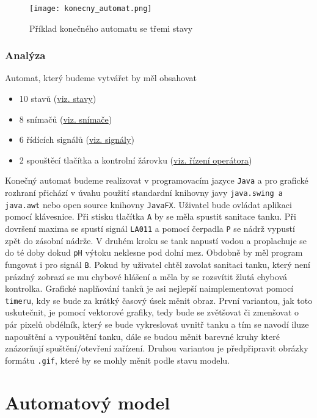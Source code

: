 \documentclass[12pt, a4paper]{article}
\begin{document}
\begin{figure}[h!]
    \centering
    \texttt{[image: konecny\_automat.png]}
    \caption{Příklad konečného automatu se třemi stavy}
    \label{konecny_automat: 1}
\end{figure}

\subsubsection{Analýza}

Automat, který budeme vytvářet by měl obsahovat
\begin{itemize}
    \item 10 stavů (\hyperref[sec: stavy]{viz. stavy})
    \item 8 snímačů (\hyperref[sec: snimace]{viz. snímače})
    \item 6 řídících signálů (\hyperref[sec: signaly]{viz. signály})
    \item 2 spouštěcí tlačítka a kontrolní žárovku (\hyperref[sec: operator]{viz. řízení operátora})
\end{itemize}

Konečný automat budeme realizovat v programovacím jazyce \texttt{Java} a pro grafické rozhraní přichází v úvahu použití standardní knihovny
javy \texttt{java.swing a java.awt} nebo open source knihovny \texttt{JavaFX}. Uživatel bude ovládat aplikaci pomocí klávesnice. Při stisku tlačítka \texttt{A} by se měla spustit
sanitace tanku. Při dovršení maxima se spustí signál \texttt{LA011} a pomocí čerpadla \texttt{P} se nádrž vypustí
zpět do zásobní nádrže. V druhém kroku se tank napustí vodou a proplachuje se do té doby dokud \texttt{pH} výtoku neklesne pod dolní mez.
Obdobně by měl program fungovat i pro signál \texttt{B}. Pokud by uživatel chtěl zavolat sanitaci tanku, který není prázdný zobrazí se mu
chybové hlášení a měla by se rozsvítit žlutá chybová kontrolka. Grafické naplňování tanků je asi nejlepší naimplementovat
pomocí \texttt{timeru}, kdy se bude za krátký časový úsek měnit obraz. První variantou, jak toto uskutečnit, je pomocí vektorové grafiky, tedy bude se zvětšovat či zmenšovat o pár pixelů obdélník, který se bude vykreslovat uvnitř tanku
a tím se navodí iluze napouštění a vypouštění tanku, dále se budou měnit barevné kruhy které znázorňují spuštění/otevření zařízení. Druhou variantou je předpřipravit obrázky formátu \texttt{.gif}, které by se mohly měnit podle stavu modelu.

\section{Automatový model}
\end{document}
